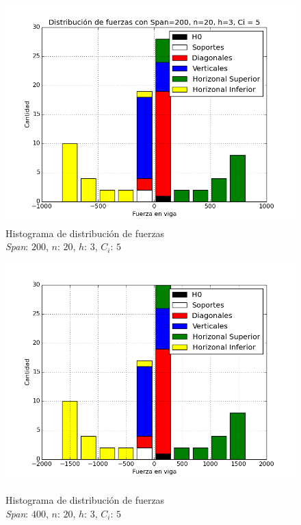 \begin{figure}[h!]
\begin{center}
\includegraphics[scale=0.5]{archivos/graficos/hist_200.png}
\caption{\label{fig:hist_fuerzas}Histograma de distribución de fuerzas\\
\textit{Span}: $200$, $n$: $20$, $h$: $3$, $C_i$: $5$}
\end{center}
\end{figure}

\begin{figure}[h!]
\begin{center}
\includegraphics[scale=0.5]{archivos/graficos/hist_400.png}\\
\caption{\label{fig:hist_fuerzas2}Histograma de distribución de fuerzas\\
\textit{Span}: $400$, $n$: $20$, $h$: $3$, $C_i$: $5$}
\end{center}
\end{figure}

